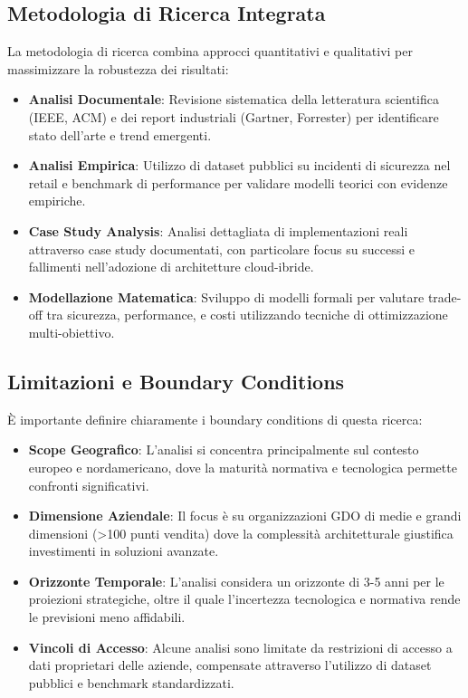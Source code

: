 \documentclass[12pt,a4paper,oneside]{book}
\begin{document}
\subsection{Metodologia di Ricerca Integrata}
\label{ssec:metodologia_ricerca}

La metodologia di ricerca combina approcci quantitativi e qualitativi per massimizzare la robustezza dei risultati:
\begin{itemize}
    \item \textbf{Analisi Documentale}: Revisione sistematica della letteratura scientifica (IEEE, ACM) e dei report industriali (Gartner, Forrester) per identificare stato dell'arte e trend emergenti.
    \item \textbf{Analisi Empirica}: Utilizzo di dataset pubblici su incidenti di sicurezza nel retail e benchmark di performance per validare modelli teorici con evidenze empiriche.
    \item \textbf{Case Study Analysis}: Analisi dettagliata di implementazioni reali attraverso case study documentati, con particolare focus su successi e fallimenti nell'adozione di architetture cloud-ibride.
    \item \textbf{Modellazione Matematica}: Sviluppo di modelli formali per valutare trade-off tra sicurezza, performance, e costi utilizzando tecniche di ottimizzazione multi-obiettivo.
\end{itemize}

\subsection{Limitazioni e Boundary Conditions}
\label{ssec:limitazioni}

È importante definire chiaramente i boundary conditions di questa ricerca:
\begin{itemize}
    \item \textbf{Scope Geografico}: L'analisi si concentra principalmente sul contesto europeo e nordamericano, dove la maturità normativa e tecnologica permette confronti significativi.
    \item \textbf{Dimensione Aziendale}: Il focus è su organizzazioni GDO di medie e grandi dimensioni (>100 punti vendita) dove la complessità architetturale giustifica investimenti in soluzioni avanzate.
    \item \textbf{Orizzonte Temporale}: L'analisi considera un orizzonte di 3-5 anni per le proiezioni strategiche, oltre il quale l'incertezza tecnologica e normativa rende le previsioni meno affidabili.
    \item \textbf{Vincoli di Accesso}: Alcune analisi sono limitate da restrizioni di accesso a dati proprietari delle aziende, compensate attraverso l'utilizzo di dataset pubblici e benchmark standardizzati.
\end{itemize}
\end{document}
